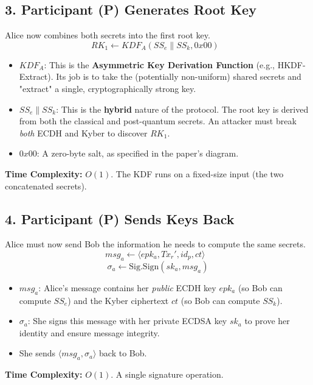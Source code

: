 \documentclass[12pt]{article}
\begin{document}
\subsection*{3. Participant (P) Generates Root Key}
Alice now combines both secrets into the first root key.
\[
RK_1 \leftarrow KDF_A(SS_e \parallel SS_k, 0x00) \text{ }
\]
\begin{itemize}
    \item \textbf{\(KDF_A\)}: This is the \textbf{Asymmetric Key Derivation Function} (e.g., HKDF-Extract). Its job is to take the (potentially non-uniform) shared secrets and "extract" a single, cryptographically strong key.
    \item \textbf{\(SS_e \parallel SS_k\)}: This is the \textbf{hybrid} nature of the protocol. The root key is derived from both the classical and post-quantum secrets. An attacker must break \textit{both} ECDH and Kyber to discover \(RK_1\).
    \item \textbf{\(0x00\)}: A zero-byte salt, as specified in the paper's diagram.
\end{itemize}
\textbf{Time Complexity:} \( O(1) \). The KDF runs on a fixed-size input (the two concatenated secrets).

\subsection*{4. Participant (P) Sends Keys Back}
Alice must now send Bob the information he needs to compute the same secrets.
\[
msg_a \leftarrow \langle epk_a, Tx_r', id_p, ct \rangle \text{ }
\]
\[
\sigma_a \leftarrow \text{Sig.Sign}(sk_a, msg_a)
\]
\begin{itemize}
    \item \textbf{\(msg_a\)}: Alice's message contains her \textit{public} ECDH key \(epk_a\) (so Bob can compute \(SS_e\)) and the Kyber ciphertext \(ct\) (so Bob can compute \(SS_k\)).
    \item \textbf{\(\sigma_a\)}: She signs this message with her private ECDSA key \(sk_a\) to prove her identity and ensure message integrity.
    \item She sends \( \langle msg_a, \sigma_a \rangle \) back to Bob.
\end{itemize}
\textbf{Time Complexity:} \( O(1) \). A single signature operation.
\end{document}
